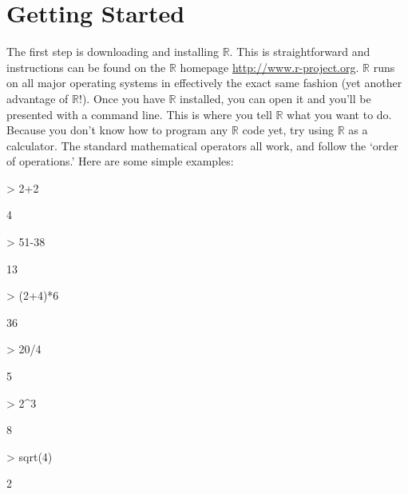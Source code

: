 \documentclass[12pt]{article}
\begin{document}
\section{Getting Started}
The first step is downloading and installing $\mathbb{R}$. This is straightforward and instructions can be found on the $\mathbb{R}$ homepage \url{http://www.r-project.org}. $\mathbb{R}$ runs on all major operating systems in effectively the exact same fashion (yet another advantage of $\mathbb{R}$!). Once you have $\mathbb{R}$ installed, you can open it and you'll be presented with a command line. This is where you tell $\mathbb{R}$ what you want to do. Because you don't know how to program any $\mathbb{R}$ code yet, try using $\mathbb{R}$ as a calculator. The standard mathematical operators all work, and follow the `order of operations.' Here are some simple examples: 
\begin{Schunk}
\begin{Sinput}
> 2+2
\end{Sinput}
\begin{Soutput}
[1] 4
\end{Soutput}
\begin{Sinput}
> 51-38
\end{Sinput}
\begin{Soutput}
[1] 13
\end{Soutput}
\begin{Sinput}
> (2+4)*6
\end{Sinput}
\begin{Soutput}
[1] 36
\end{Soutput}
\begin{Sinput}
> 20/4
\end{Sinput}
\begin{Soutput}
[1] 5
\end{Soutput}
\begin{Sinput}
> 2^3
\end{Sinput}
\begin{Soutput}
[1] 8
\end{Soutput}
\begin{Sinput}
> sqrt(4)
\end{Sinput}
\begin{Soutput}
[1] 2
\end{Soutput}
\end{Schunk}
\end{document}

